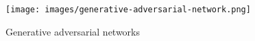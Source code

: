 
    \begin{figure}[h]
        \caption{Generative adversarial networks \cite{gan_image}}
        \centering
        \texttt{[image: images/generative-adversarial-network.png]}
    \end{figure} 
